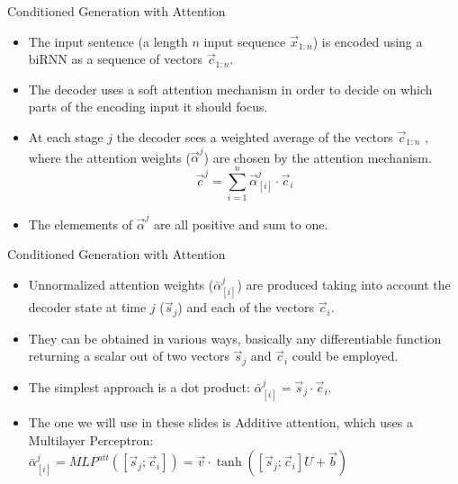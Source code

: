 \documentclass[handout]{beamer}
\begin{document}
\begin{frame}{Conditioned Generation with Attention}
\begin{scriptsize}
\begin{itemize}
\item The input sentence (a length $n$ input sequence $\vec{x}_{1:n}$) is encoded using a biRNN as a sequence of vectors $\vec{c}_{1:n}$.  
\item The decoder uses a soft attention mechanism in order to decide on which parts of the encoding input it should focus. 
\item At each stage $j$ the decoder sees a weighted average of the vectors $\vec{c}_{1:n}$ , where the attention weights ($\vec{\alpha}^j$) are chosen by the attention mechanism.
\begin{displaymath}
\vec{c}^j = \sum_{i=1}^{n} \vec{\alpha}_{[i]}^{j}\cdot \vec{c}_i 
\end{displaymath}
\item The elemements of $\vec{\alpha}^j$ are all positive and sum to one.



\end{itemize}
\end{scriptsize}
\end{frame}





\begin{frame}{Conditioned Generation with Attention}
\begin{scriptsize}
\begin{itemize}
\item Unnormalized attention weights ($\bar{\alpha}_{[i]}^j$)  are produced taking into account the decoder state at time $j$ ($\vec{s}_j$) and each of the vectors $\vec{c}_i$.
\item They can be obtained in various ways, basically any differentiable function returning a scalar out of two vectors $\vec{s}_j$ and  $\vec{c}_i$ could be employed. 
\item The simplest approach is a dot product:  $\bar{\alpha}_{[i]}^j = \vec{s}_j \cdot \vec{c}_i$. 
\item The one we will use in these slides is Additive attention, which uses a Multilayer Perceptron: $\bar{\alpha}_{[i]}^j = MLP^{att}([\vec{s}_j;\vec{c}_i]) = \vec{v} \cdot \operatorname{tanh}([\vec{s}_j;\vec{c}_i]U +\vec{b})$

\end{itemize}
\end{scriptsize}
\end{frame}
\end{document}
